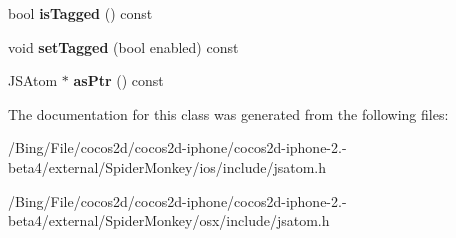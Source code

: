 \begin{DoxyCompactItemize}
\item 
\hypertarget{classjs_1_1_atom_state_entry_a74e1be45710b4c6a6145381d093a2ed1}{bool {\bfseries is\-Tagged} () const }\label{classjs_1_1_atom_state_entry_a74e1be45710b4c6a6145381d093a2ed1}

\item 
\hypertarget{classjs_1_1_atom_state_entry_a402d64ab6493f4c55abdc815c59f49c9}{void {\bfseries set\-Tagged} (bool enabled) const }\label{classjs_1_1_atom_state_entry_a402d64ab6493f4c55abdc815c59f49c9}

\item 
\hypertarget{classjs_1_1_atom_state_entry_abdf0400452a95ebb6172f18075422429}{J\-S\-Atom $\ast$ {\bfseries as\-Ptr} () const }\label{classjs_1_1_atom_state_entry_abdf0400452a95ebb6172f18075422429}

\end{DoxyCompactItemize}


The documentation for this class was generated from the following files\-:\begin{DoxyCompactItemize}
\item 
/\-Bing/\-File/cocos2d/cocos2d-\/iphone/cocos2d-\/iphone-\/2.-\/beta4/external/\-Spider\-Monkey/ios/include/jsatom.\-h\item 
/\-Bing/\-File/cocos2d/cocos2d-\/iphone/cocos2d-\/iphone-\/2.-\/beta4/external/\-Spider\-Monkey/osx/include/jsatom.\-h\end{DoxyCompactItemize}
